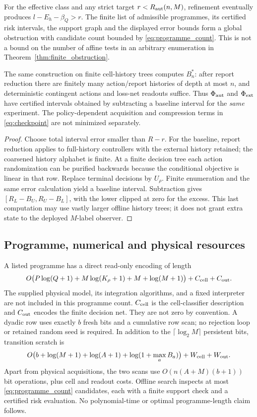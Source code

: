 \begin{corollary}\label{cor:effective_obstruction}
For the effective class and any strict target $r<R_{\mathrm{aut}}(n,M)$, refinement eventually produces $l-E_h-\beta_Q>r$. The finite list of admissible programmes, its certified risk intervals, the support graph and the displayed error bounds form a global obstruction with candidate count bounded by \eqref{eq:programme_count}. This is not a bound on the number of affine tests in an arbitrary enumeration in Theorem~\ref{thm:finite_obstruction}.

The same construction on finite cell-history trees computes $B_n^*$: after report reduction there are finitely many action/report histories of depth at most $n$, and deterministic contingent actions and loss-net readouts suffice. Thus $\Phi_{\mathrm{aut}}$ and $\Phi_{\mathrm{ext}}$ have certified intervals obtained by subtracting a baseline interval for the \emph{same} experiment. The policy-dependent acquisition and compression terms in \eqref{eq:checkpoint} are not minimized separately.
\end{corollary}
\begin{proof}
Choose total interval error smaller than $R-r$. For the baseline, report reduction applies to full-history controllers with the external history retained; the coarsened history alphabet is finite. At a finite decision tree each action randomization can be purified backwards because the conditional objective is linear in that row. Replace terminal decisions by $U_\rho$. Finite enumeration and the same error calculation yield a baseline interval. Subtraction gives $[R_L-B_U,R_U-B_L]$, with the lower clipped at zero for the excess. This last computation may use vastly larger offline history trees; it does not grant extra state to the deployed $M$-label observer.
\end{proof}

\subsection{Programme, numerical and physical resources}
A listed programme has a direct read-only encoding of length
\begin{equation}\label{eq:effective_bits}
 O\big(P\log(Q+1)+M\log(K_\rho+1)+M+\log(M+1)\big)+C_{\rm cell}+C_{\rm out}.
\end{equation}
The supplied physical model, its integration algorithms, and a fixed interpreter are not included in this programme count. $C_{\rm cell}$ is the cell-classifier description and $C_{\rm out}$ encodes the finite decision net. They are not zero by convention. A dyadic row uses exactly $b$ fresh bits and a cumulative row scan; no rejection loop or retained random seed is required. In addition to the $\lceil\log_2M\rceil$ persistent bits, transition scratch is
\[
 O\big(b+\log(M+1)+\log(A+1)+\log(1+\max_aB_a)\big)+W_{\rm cell}+W_{\rm out}.
\]
Apart from physical acquisitions, the two scans use $O(n(A+M)(b+1))$ bit operations, plus cell and readout costs. Offline search inspects at most \eqref{eq:programme_count} candidates, each with a finite support check and a certified risk evaluation. No polynomial-time or optimal programme-length claim follows.

